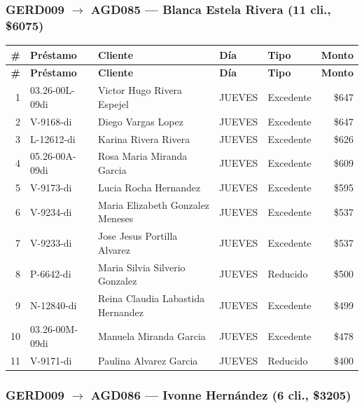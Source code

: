 \documentclass[11pt,a4paper]{article}
\newcommand{\money}[1]{\$\num{#1}}
\begin{document}
\subsubsection{GERD009 $\rightarrow$ AGD085 --- Blanca Estela Rivera (11 cli., \money{6075})}


\begin{center}
\renewcommand{\arraystretch}{1.1}
\footnotesize
\begin{longtable}{rlp{5.5cm}llr}
\toprule
\textbf{\#} & \textbf{Pr\'estamo} & \textbf{Cliente} & \textbf{D\'ia} & \textbf{Tipo} & \textbf{Monto} \\
\midrule
\endfirsthead
\toprule
\textbf{\#} & \textbf{Pr\'estamo} & \textbf{Cliente} & \textbf{D\'ia} & \textbf{Tipo} & \textbf{Monto} \\
\midrule
\endhead
1 & 03.26-00L-09di & Victor Hugo Rivera Espejel & JUEVES & Excedente & \money{647} \\
2 & V-9168-di & Diego Vargas Lopez & JUEVES & Excedente & \money{647} \\
3 & L-12612-di & Karina Rivera Rivera & JUEVES & Excedente & \money{626} \\
4 & 05.26-00A-09di & Rosa Maria Miranda Garcia & JUEVES & Excedente & \money{609} \\
5 & V-9173-di & Lucia Rocha Hernandez & JUEVES & Excedente & \money{595} \\
6 & V-9234-di & Maria Elizabeth Gonzalez Meneses & JUEVES & Excedente & \money{537} \\
7 & V-9233-di & Jose Jesus Portilla Alvarez & JUEVES & Excedente & \money{537} \\
8 & P-6642-di & Maria Silvia Silverio Gonzalez & JUEVES & Reducido & \money{500} \\
9 & N-12840-di & Reina Claudia Labastida Hernandez & JUEVES & Excedente & \money{499} \\
10 & 03.26-00M-09di & Manuela Miranda Garcia & JUEVES & Excedente & \money{478} \\
11 & V-9171-di & Paulina Alvarez Garcia & JUEVES & Reducido & \money{400} \\

\bottomrule
\end{longtable}
\end{center}
\subsubsection{GERD009 $\rightarrow$ AGD086 --- Ivonne Hernández (6 cli., \money{3205})}
\end{document}
